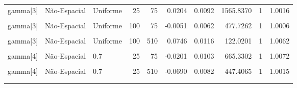 \documentclass[
]{article}
\begin{document}
\begin{longtable}[t]{lllrrrrrrr}
gamma[3] & Não-Espacial & Uniforme & 25 & 75 & 0.0204 & 0.0092 & 1565.8370 & 1 & 1.0016\\
\cmidrule{1-10}\pagebreak[0]
\cellcolor{gray!10}{gamma[3]} & \cellcolor{gray!10}{Espacial} & \cellcolor{gray!10}{Uniforme} & \cellcolor{gray!10}{100} & \cellcolor{gray!10}{75} & \cellcolor{gray!10}{-0.0012} & \cellcolor{gray!10}{0.0066} & \cellcolor{gray!10}{494.2750} & \cellcolor{gray!10}{1} & \cellcolor{gray!10}{1.0005}\\
\cmidrule{1-10}\pagebreak[0]
gamma[3] & Não-Espacial & Uniforme & 100 & 75 & -0.0051 & 0.0062 & 477.7262 & 1 & 1.0006\\
\cmidrule{1-10}\pagebreak[0]
\cellcolor{gray!10}{gamma[3]} & \cellcolor{gray!10}{Espacial} & \cellcolor{gray!10}{Uniforme} & \cellcolor{gray!10}{100} & \cellcolor{gray!10}{510} & \cellcolor{gray!10}{0.0787} & \cellcolor{gray!10}{0.0141} & \cellcolor{gray!10}{127.6622} & \cellcolor{gray!10}{1} & \cellcolor{gray!10}{1.0063}\\
\cmidrule{1-10}\pagebreak[0]
gamma[3] & Não-Espacial & Uniforme & 100 & 510 & 0.0746 & 0.0116 & 122.0201 & 1 & 1.0062\\
\cmidrule{1-10}\pagebreak[0]
\cellcolor{gray!10}{gamma[4]} & \cellcolor{gray!10}{Espacial} & \cellcolor{gray!10}{0.7} & \cellcolor{gray!10}{25} & \cellcolor{gray!10}{75} & \cellcolor{gray!10}{0.0127} & \cellcolor{gray!10}{0.0161} & \cellcolor{gray!10}{207.5590} & \cellcolor{gray!10}{1} & \cellcolor{gray!10}{1.0036}\\
\cmidrule{1-10}\pagebreak[0]
gamma[4] & Não-Espacial & 0.7 & 25 & 75 & -0.0201 & 0.0103 & 665.3302 & 1 & 1.0072\\
\cmidrule{1-10}\pagebreak[0]
\cellcolor{gray!10}{gamma[4]} & \cellcolor{gray!10}{Espacial} & \cellcolor{gray!10}{0.7} & \cellcolor{gray!10}{25} & \cellcolor{gray!10}{510} & \cellcolor{gray!10}{-0.1032} & \cellcolor{gray!10}{0.0123} & \cellcolor{gray!10}{178.1445} & \cellcolor{gray!10}{0} & \cellcolor{gray!10}{1.0649}\\
\cmidrule{1-10}\pagebreak[0]
gamma[4] & Não-Espacial & 0.7 & 25 & 510 & -0.0690 & 0.0082 & 447.4065 & 1 & 1.0015\\
\cmidrule{1-10}\pagebreak[0]
\cellcolor{gray!10}{gamma[4]} & \cellcolor{gray!10}{Espacial} & \cellcolor{gray!10}{0.7} & \cellcolor{gray!10}{100} & \cellcolor{gray!10}{75} & \cellcolor{gray!10}{0.0038} & \cellcolor{gray!10}{0.0134} & \cellcolor{gray!10}{114.1329} & \cellcolor{gray!10}{1} & \cellcolor{gray!10}{1.0366}\\
\cmidrule{1-10}\pagebreak[0]

\end{longtable}
\end{document}
